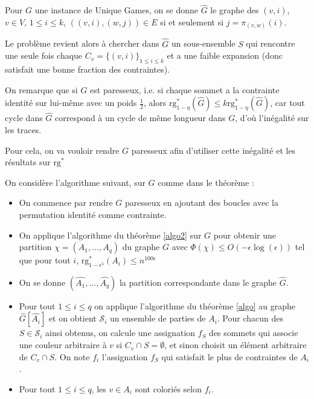 \documentclass[a4paper,10pt]{article}
\theoremstyle{plain}
\theoremstyle{Definition}
\theoremstyle{remark}
\newcommand{\rg}{\mathrm{rg}}
\begin{document}
Pour $G$ une instance de Unique Games, on se donne $\hat{G}$ le graphe des
$(v,i)$, $v \in V$, $1 \leq i \leq k$, $((v,i), (w,j)) \in E$ si et
seulement si $ j = \pi_{(v,w)}(i)$.

Le problème revient alors à chercher dans $\hat{G}$ un sous-ensemble $S$
qui rencontre une seule fois chaque $C_v = \{(v,i)\}_{1 \leq i \leq k}$ et
a une faible expansion (donc satisfait une bonne fraction des contraintes).

\vspace{0.5cm}

On remarque que si $G$ est paresseux, i.e. si chaque sommet a la contrainte
identité sur lui-même avec un poids $\frac{1}{2}$, alors
$\rg^*_{1-\eta}(\hat{G}) \leq k \rg^*_{1-\eta}(\hat{G})$, car tout cycle dans 
$\hat{G}$ correspond à un cycle de même longueur dans $G$, d'où 
l'inégalité sur les traces.

Pour cela, on va vouloir rendre $G$ paresseux afin d'utiliser cette
inégalité et les résultats sur $\rg^*$

\vspace{1cm}

On considère l'algorithme suivant, sur $G$ comme dans le théorème :

\begin{itemize}

\item On commence par rendre $G$ paresseux en ajoutant des boucles avec la
permutation identité comme contrainte.

\item On applique l'algorithme du théorème \ref{algo2} sur $G$ pour obtenir une
partition $\chi=(A_1,\dots,A_q)$ du graphe $G$ avec $\Phi(\chi) \leq
O(-\epsilon \log(\epsilon))$ tel que pour tout $i$, $\rg^*_{1-
  \epsilon^5}(A_i) \leq n^{100 \epsilon}$

\item On se donne $(\hat{A_1},\dots,\hat{A_q})$ la partition correspondante
  dans le graphe $\hat{G}$.

\item Pour tout $1 \leq i \leq q$ on applique l'algorithme du théorème
  \ref{algo} au graphe $\hat{G}[\hat{A_i}]$ et on obtient ${\mathcal S}_i$
  un ensemble de parties de $A_i$. Pour chacun des $S \in {\mathcal S}_i$ ainsi
  obtenus, on calcule une assignation $f_S$ des sommets qui associe une
  couleur arbitraire à $v$ si $C_v \cap S = \emptyset$, et sinon choisit un
  élément arbitraire de $C_v \cap S$. On note $f_i$ l'assignation $f_S$ qui
  satisfait le plus de contraintes de $A_i$.

\item Pour tout $1 \leq i \leq q$, les $v \in A_i$ sont coloriés selon $f_i$.

\end{itemize}
\end{document}
